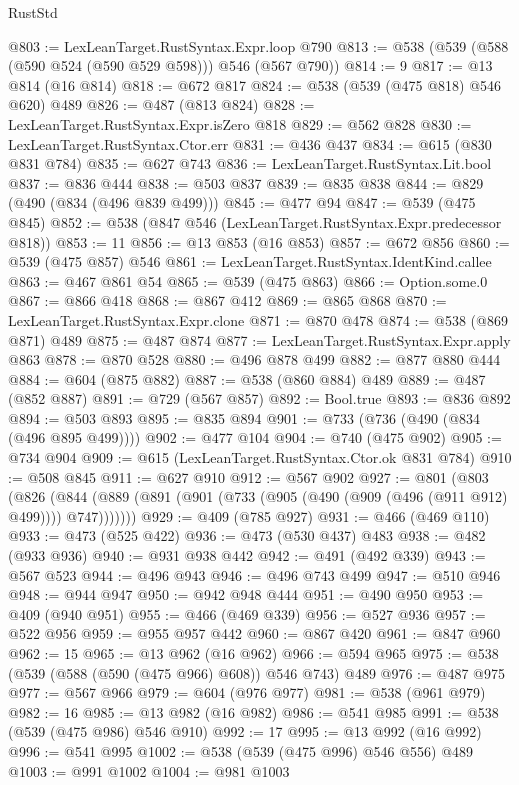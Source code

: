 \begin{lexlean}{RustStd}
\begin{coremodule}
@803 := LexLeanTarget.RustSyntax.Expr.loop @790
@813 := @538 (@539 (@588 (@590 @524 (@590 @529 @598))) @546 (@567 @790))
@814 := 9
@817 := @13 @814 (@16 @814)
@818 := @672 @817
@824 := @538 (@539 (@475 @818) @546 @620) @489
@826 := @487 (@813 @824)
@828 := LexLeanTarget.RustSyntax.Expr.isZero @818
@829 := @562 @828
@830 := LexLeanTarget.RustSyntax.Ctor.err
@831 := @436 @437
@834 := @615 (@830 @831 @784)
@835 := @627 @743
@836 := LexLeanTarget.RustSyntax.Lit.bool
@837 := @836 @444
@838 := @503 @837
@839 := @835 @838
@844 := @829 (@490 (@834 (@496 @839 @499)))
@845 := @477 @94
@847 := @539 (@475 @845)
@852 := @538 (@847 @546 (LexLeanTarget.RustSyntax.Expr.predecessor @818))
@853 := 11
@856 := @13 @853 (@16 @853)
@857 := @672 @856
@860 := @539 (@475 @857) @546
@861 := LexLeanTarget.RustSyntax.IdentKind.callee
@863 := @467 @861 @54
@865 := @539 (@475 @863)
@866 := Option.some.{0}
@867 := @866 @418
@868 := @867 @412
@869 := @865 @868
@870 := LexLeanTarget.RustSyntax.Expr.clone
@871 := @870 @478
@874 := @538 (@869 @871) @489
@875 := @487 @874
@877 := LexLeanTarget.RustSyntax.Expr.apply @863
@878 := @870 @528
@880 := @496 @878 @499
@882 := @877 @880 @444
@884 := @604 (@875 @882)
@887 := @538 (@860 @884) @489
@889 := @487 (@852 @887)
@891 := @729 (@567 @857)
@892 := Bool.true
@893 := @836 @892
@894 := @503 @893
@895 := @835 @894
@901 := @733 (@736 (@490 (@834 (@496 @895 @499))))
@902 := @477 @104
@904 := @740 (@475 @902)
@905 := @734 @904
@909 := @615 (LexLeanTarget.RustSyntax.Ctor.ok @831 @784)
@910 := @508 @845
@911 := @627 @910
@912 := @567 @902
@927 := @801
    (@803
      (@826 (@844 (@889 (@891 (@901 (@733 (@905 (@490 (@909 (@496 (@911 @912) @499)))) @747)))))))
@929 := @409 (@785 @927)
@931 := @466 (@469 @110)
@933 := @473 (@525 @422)
@936 := @473 (@530 @437) @483
@938 := @482 (@933 @936)
@940 := @931 @938 @442
@942 := @491 (@492 @339)
@943 := @567 @523
@944 := @496 @943
@946 := @496 @743 @499
@947 := @510 @946
@948 := @944 @947
@950 := @942 @948 @444
@951 := @490 @950
@953 := @409 (@940 @951)
@955 := @466 (@469 @339)
@956 := @527 @936
@957 := @522 @956
@959 := @955 @957 @442
@960 := @867 @420
@961 := @847 @960
@962 := 15
@965 := @13 @962 (@16 @962)
@966 := @594 @965
@975 := @538 (@539 (@588 (@590 (@475 @966) @608)) @546 @743) @489
@976 := @487 @975
@977 := @567 @966
@979 := @604 (@976 @977)
@981 := @538 (@961 @979)
@982 := 16
@985 := @13 @982 (@16 @982)
@986 := @541 @985
@991 := @538 (@539 (@475 @986) @546 @910)
@992 := 17
@995 := @13 @992 (@16 @992)
@996 := @541 @995
@1002 := @538 (@539 (@475 @996) @546 @556) @489
@1003 := @991 @1002
@1004 := @981 @1003

\end{coremodule}
\end{lexlean}
